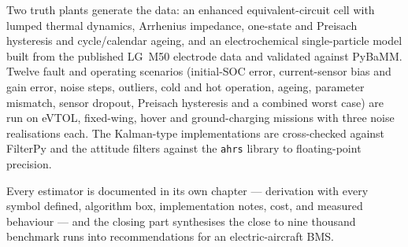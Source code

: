 Two truth plants generate the data: an enhanced equivalent-circuit cell with lumped thermal
dynamics, Arrhenius impedance, one-state and Preisach hysteresis and cycle/calendar ageing,
and an electrochemical single-particle model built from the published LG~M50 electrode data
and validated against PyBaMM. Twelve fault and operating scenarios (initial-SOC error,
current-sensor bias and gain error, noise steps, outliers, cold and hot operation, ageing,
parameter mismatch, sensor dropout, Preisach hysteresis and a combined worst case) are run on
eVTOL, fixed-wing, hover and ground-charging missions with three noise realisations each.
The Kalman-type implementations are cross-checked against FilterPy and the attitude filters
against the \texttt{ahrs} library to floating-point precision.

Every estimator is documented in its own chapter --- derivation with every symbol defined,
algorithm box, implementation notes, cost, and measured behaviour --- and the closing part
synthesises the close to nine thousand benchmark runs into recommendations for an
electric-aircraft BMS.
